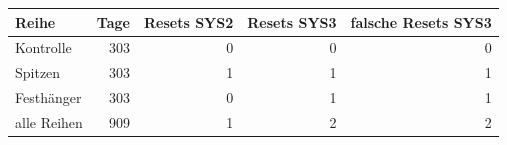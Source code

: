 \begin{tabular}{lrrrr}
\toprule
Reihe & Tage & Resets SYS2 & Resets SYS3 & falsche Resets SYS3 \\
\midrule
Kontrolle & 303 & 0 & 0 & 0 \\
Spitzen & 303 & 1 & 1 & 1 \\
Festhänger & 303 & 0 & 1 & 1 \\
alle Reihen & 909 & 1 & 2 & 2 \\
\bottomrule
\end{tabular}
